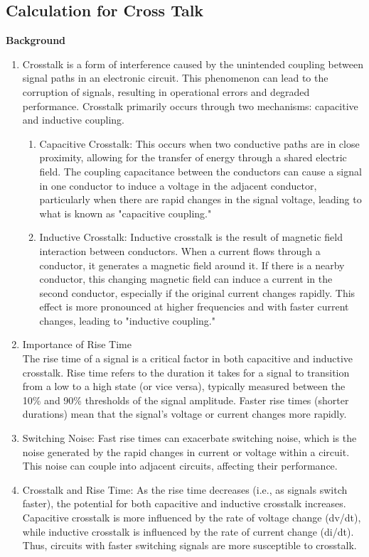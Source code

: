 \documentclass[a4paper,11pt]{article}%
\begin{document}
\subsection{Calculation for Cross Talk}
\textbf{Background}
\begin{enumerate}
	\item Crosstalk is a form of interference caused by the unintended coupling between signal paths in an electronic circuit. This phenomenon can lead to the corruption of signals, resulting in operational errors and degraded performance. Crosstalk primarily occurs through two mechanisms: capacitive and inductive coupling.
	\begin{enumerate}
		\item Capacitive Crosstalk: This occurs when two conductive paths are in close proximity, allowing for the transfer of energy through a shared electric field. The coupling capacitance between the conductors can cause a signal in one conductor to induce a voltage in the adjacent conductor, particularly when there are rapid changes in the signal voltage, leading to what is known as "capacitive coupling."
		\item Inductive Crosstalk: Inductive crosstalk is the result of magnetic field interaction between conductors. When a current flows through a conductor, it generates a magnetic field around it. If there is a nearby conductor, this changing magnetic field can induce a current in the second conductor, especially if the original current changes rapidly. This effect is more pronounced at higher frequencies and with faster current changes, leading to "inductive coupling."
	\end{enumerate}
	\item Importance of Rise Time \\ 
	The rise time of a signal is a critical factor in both capacitive and inductive crosstalk. Rise time refers to the duration it takes for a signal to transition from a low to a high state (or vice versa), typically measured between the 10\% and 90\% thresholds of the signal amplitude. Faster rise times (shorter durations) mean that the signal's voltage or current changes more rapidly.

	\item Switching Noise: Fast rise times can exacerbate switching noise, which is the noise generated by the rapid changes in current or voltage within a circuit. This noise can couple into adjacent circuits, affecting their performance.
	\item 
	Crosstalk and Rise Time: As the rise time decreases (i.e., as signals switch faster), the potential for both capacitive and inductive crosstalk increases. Capacitive crosstalk is more influenced by the rate of voltage change (dv/dt), while inductive crosstalk is influenced by the rate of current change (di/dt). Thus, circuits with faster switching signals are more susceptible to crosstalk.
\end{enumerate}
\end{document}
